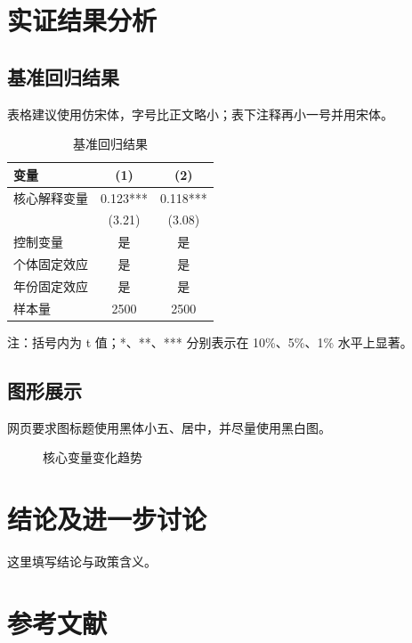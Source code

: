 \documentclass[UTF8,a4paper,zihao=5,fontset=mac]{ctexart}
\begin{document}
\section{实证结果分析}

\subsection{基准回归结果}

表格建议使用仿宋体，字号比正文略小；表下注释再小一号并用宋体。

\begin{table}[htbp]
  \centering
  \caption{基准回归结果}
  {\fangsong{}
  \begin{tabular}{lcc}
    \toprule
    变量 & (1) & (2) \\
    \midrule
    核心解释变量 & 0.123*** & 0.118*** \\
                    & (3.21) & (3.08) \\
    控制变量       & 是 & 是 \\
    个体固定效应   & 是 & 是 \\
    年份固定效应   & 是 & 是 \\
    样本量         & 2500 & 2500 \\
    \bottomrule
  \end{tabular}

  \par\smallskip
  {\songti{}注：括号内为 t 值；*、**、*** 分别表示在 10\%、5\%、1\% 水平上显著。}
  }
\end{table}

\subsection{图形展示}

网页要求图标题使用黑体小五、居中，并尽量使用黑白图。

\begin{figure}[htbp]
  \centering
  \fbox{\rule{0pt}{5cm}\rule{0.82\linewidth}{0pt}}
  \caption{核心变量变化趋势}
\end{figure}

\section{结论及进一步讨论}

这里填写结论与政策含义。

\section*{参考文献}
\end{document}
